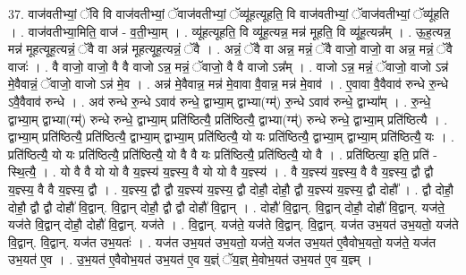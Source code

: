 \documentclass[17pt]{extarticle}
\begin{document}
37. वाज॑वतीभ्यां॒ ॅवि वि वाज॑वतीभ्यां॒ ॅवाज॑वतीभ्यां॒ ॅव्यू॑हत्यूहति॒ वि वाज॑वतीभ्यां॒ ॅवाज॑वतीभ्यां॒ ॅव्यू॑हति । . वाज॑वतीभ्या॒मिति॒ वाज॑ - व॒ती॒भ्या॒म् । . व्यू॑हत्यूहति॒ वि व्यू॑ह॒त्यन्न॒ मन्न॑ मूहति॒ वि व्यू॑ह॒त्यन्न᳚म् । . ऊ॒ह॒त्यन्न॒ मन्न॑ मूहत्यूह॒त्यन्नं॒ ॅवै वा अन्न॑ मूहत्यूह॒त्यन्नं॒ ॅवै । . अन्नं॒ ॅवै वा अन्न॒ मन्नं॒ ॅवै वाजो॒ वाजो॒ वा अन्न॒ मन्नं॒ ॅवै वाजः॑ । . वै वाजो॒ वाजो॒ वै वै वाजो ऽन्न॒ मन्नं॒ ॅवाजो॒ वै वै वाजो ऽन्न᳚म् । . वाजो ऽन्न॒ मन्नं॒ ॅवाजो॒ वाजो ऽन्न॑ मे॒वैवान्नं॒ ॅवाजो॒ वाजो ऽन्न॑ मे॒व । . अन्न॑ मे॒वैवान्न॒ मन्न॑ मे॒वावा वै॒वान्न॒ मन्न॑ मे॒वाव॑ । . ए॒वावा वै॒वैवाव॑ रुन्धे रु॒न्धे ऽवै॒वैवाव॑ रुन्धे । . अव॑ रुन्धे रु॒न्धे ऽवाव॑ रुन्धे॒ द्वाभ्या॒म् द्वाभ्या(ग्म्॑) रु॒न्धे ऽवाव॑ रुन्धे॒ द्वाभ्या᳚म् । . रु॒न्धे॒ द्वाभ्या॒म् द्वाभ्या(ग्म्॑) रुन्धे रुन्धे॒ द्वाभ्या॒म् प्रति॑ष्ठित्यै॒ प्रति॑ष्ठित्यै॒ द्वाभ्या(ग्म्॑) रुन्धे रुन्धे॒ द्वाभ्या॒म् प्रति॑ष्ठित्यै । . द्वाभ्या॒म् प्रति॑ष्ठित्यै॒ प्रति॑ष्ठित्यै॒ द्वाभ्या॒म् द्वाभ्या॒म् प्रति॑ष्ठित्यै॒ यो यः प्रति॑ष्ठित्यै॒ द्वाभ्या॒म् द्वाभ्या॒म् प्रति॑ष्ठित्यै॒ यः । . प्रति॑ष्ठित्यै॒ यो यः प्रति॑ष्ठित्यै॒ प्रति॑ष्ठित्यै॒ यो वै वै यः प्रति॑ष्ठित्यै॒ प्रति॑ष्ठित्यै॒ यो वै । . प्रति॑ष्ठित्या॒ इति॒ प्रति॑ - स्थि॒त्यै॒ । . यो वै वै यो यो वै य॒ज्ञ्स्य॑ य॒ज्ञ्स्य॒ वै यो यो वै य॒ज्ञ्स्य॑ । . वै य॒ज्ञ्स्य॑ य॒ज्ञ्स्य॒ वै वै य॒ज्ञ्स्य॒ द्वौ द्वौ य॒ज्ञ्स्य॒ वै वै य॒ज्ञ्स्य॒ द्वौ । . य॒ज्ञ्स्य॒ द्वौ द्वौ य॒ज्ञ्स्य॑ य॒ज्ञ्स्य॒ द्वौ दोहौ॒ दोहौ॒ द्वौ य॒ज्ञ्स्य॑ य॒ज्ञ्स्य॒ द्वौ दोहौ᳚ । . द्वौ दोहौ॒ दोहौ॒ द्वौ द्वौ दोहौ॑ वि॒द्वान्. वि॒द्वान् दोहौ॒ द्वौ द्वौ दोहौ॑ वि॒द्वान् । . दोहौ॑ वि॒द्वान्. वि॒द्वान् दोहौ॒ दोहौ॑ वि॒द्वान्. यज॑ते॒ यज॑ते वि॒द्वान् दोहौ॒ दोहौ॑ वि॒द्वान्. यज॑ते । . वि॒द्वान्. यज॑ते॒ यज॑ते वि॒द्वान्. वि॒द्वान्. यज॑त उभ॒यत॑ उभ॒यतो॒ यज॑ते वि॒द्वान्. वि॒द्वान्. यज॑त उभ॒यतः॑ । . यज॑त उभ॒यत॑ उभ॒यतो॒ यज॑ते॒ यज॑त उभ॒यत॑ ए॒वैवोभ॒यतो॒ यज॑ते॒ यज॑त उभ॒यत॑ ए॒व । . उ॒भ॒यत॑ ए॒वैवोभ॒यत॑ उभ॒यत॑ ए॒व य॒ज्ञ्ं ॅय॒ज्ञ् मे॒वोभ॒यत॑ उभ॒यत॑ ए॒व य॒ज्ञ्म् । \newline
\pagebreak
{}
\end{document}
